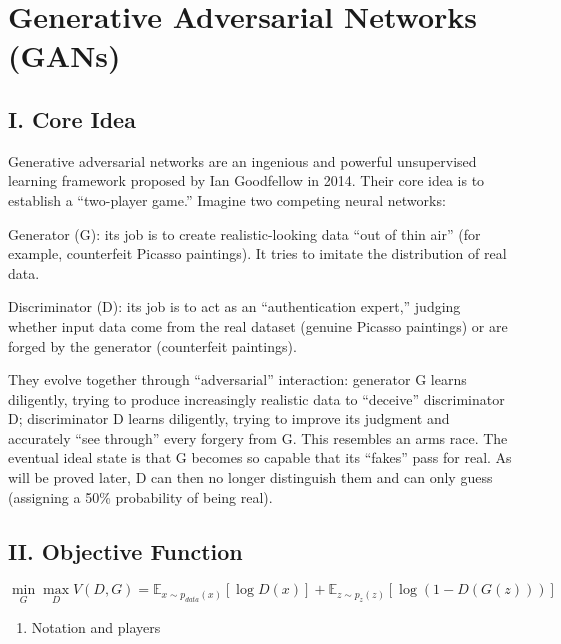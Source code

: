 \setcounter{section}{0}

\hypertarget{generative-adversarial-networks-gans}{%
\section{Generative Adversarial Networks (GANs)}\label{generative-adversarial-networks-gans}}

\hypertarget{i.-core-idea-2}{%
\subsection{I. Core Idea}\label{i.-core-idea-2}}

Generative adversarial networks are an ingenious and powerful unsupervised learning framework proposed by Ian Goodfellow in 2014. Their core idea is to establish a ``two-player game.'' Imagine two competing neural networks:

Generator (G): its job is to create realistic-looking data ``out of thin air'' (for example, counterfeit Picasso paintings). It tries to imitate the distribution of real data.

Discriminator (D): its job is to act as an ``authentication expert,'' judging whether input data come from the real dataset (genuine Picasso paintings) or are forged by the generator (counterfeit paintings).

They evolve together through ``adversarial'' interaction: generator G learns diligently, trying to produce increasingly realistic data to ``deceive'' discriminator D; discriminator D learns diligently, trying to improve its judgment and accurately ``see through'' every forgery from G. This resembles an arms race. The eventual ideal state is that G becomes so capable that its ``fakes'' pass for real. As will be proved later, D can then no longer distinguish them and can only guess (assigning a 50\% probability of being real).

\hypertarget{ii.-objective-function}{%
\subsection{II. Objective Function}\label{ii.-objective-function}}

\[
\min_G \max_D V(D, G)=\mathbb{E}_{x\sim p_{data}(x)}[\log D(x)] + \mathbb{E}_{z\sim p_z(z)}[\log(1 - D(G(z)))]
\]

\begin{enumerate}
\def\labelenumi{\arabic{enumi}.}
\tightlist
\item
  Notation and players
\end{enumerate}

